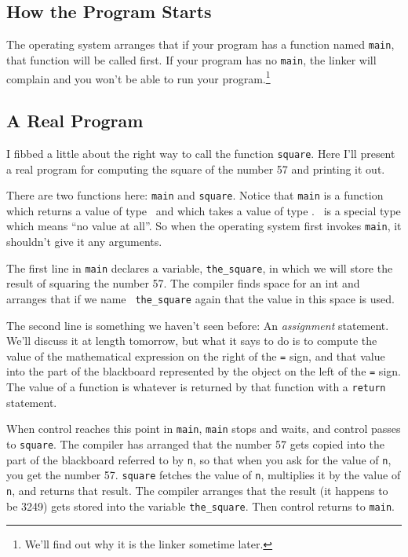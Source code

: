 \subsection{How the Program Starts}

The operating system arranges that if your program has a function named
{\tt main}, that function will be called first.  If your program has no
{\tt main}, the linker will complain and you won't be able to run your
program.\footnote{We'll find out why it is the linker sometime later.}

\subsection{A Real Program}

I fibbed a little about the right way to call the function {\tt square}.
Here I'll present a real program for computing the square of the number
57 and printing it out.



There are two functions here:  {\tt main} and {\tt square}.  Notice that
{\tt main} is a function which returns a value of type \int\ and which
takes a value of type \void. \void\ is a special type which means ``no
value at all''.  So when the operating system first invokes {\tt main},
it shouldn't give it any arguments.  

The first line in {\tt main} declares a variable, {\tt the\_square},
in which we will store the result of squaring the number 57.  The
compiler finds space for an int and arranges that if we name {\tt
the\_square} again that the value in this space is used.

The second line is something we haven't seen before:  An {\em
assignment} statement.  We'll discuss it at length tomorrow, but what it
says to do is to compute the value of the mathematical expression on the
right of the {\tt =} sign, and that value into the part of the
blackboard represented by the object on the left of the {\tt =} sign.
The value of a function is whatever is returned by that function with a
{\tt return} statement.

When control reaches this point in {\tt main}, {\tt main} stops and
waits, and control passes to {\tt square}.  The compiler has arranged
that the number 57 gets copied into the part of the blackboard referred
to by {\tt n}, so that when you ask for the value of {\tt n}, you get
the number 57.  {\tt square} fetches the value of {\tt n}, multiplies it
by the value of {\tt n}, and returns that result.  The compiler arranges
that the result (it happens to be 3249) gets stored into the variable
{\tt the\_square}.  Then control returns to {\tt main}.

